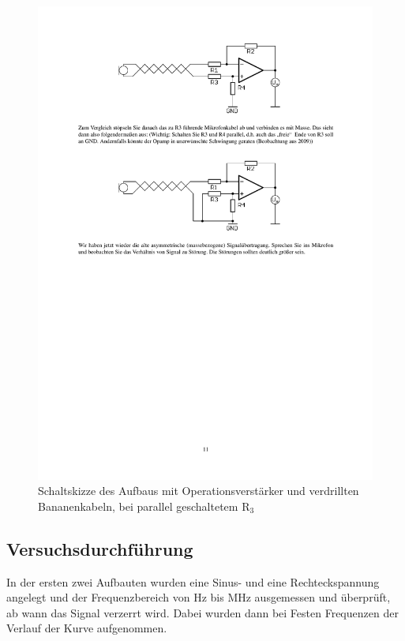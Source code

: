\documentclass[12pt,a4paper]{article}
\begin{document}
\begin{figure}[H] 
  \centering
    \includegraphics[trim = 10mm 160mm 10mm 90mm, clip, scale = 1]{2_3+Op-Amp.pdf}
  	\caption[Schaltskizze des Aufbaus mit Operationsverstärker und verdrillten Bananenkabeln, bei parallel geschaltetem R$_3$]{Schaltskizze des Aufbaus mit Operationsverstärker und verdrillten Bananenkabeln, bei parallel geschaltetem R$_3$\footnotemark}
  \label{fig:2.5}
\end{figure}


\subsection{Versuchsdurchführung}
In der ersten zwei Aufbauten wurden eine Sinus- und eine Rechteckspannung angelegt und der Frequenzbereich von \unit[100]{Hz} bis \unit[10]{MHz} ausgemessen und überprüft, ab wann das Signal verzerrt wird. Dabei wurden dann bei Festen Frequenzen der Verlauf der Kurve aufgenommen.
\end{document}
